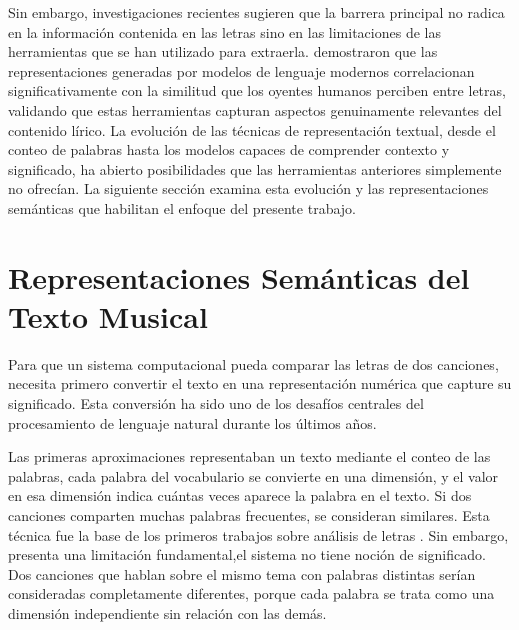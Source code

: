 Sin embargo, investigaciones recientes sugieren que la barrera principal no radica en la información contenida en las letras sino en las limitaciones de las herramientas que se han utilizado para extraerla. \textcite{akama_2024_lyric_similarity} demostraron que las representaciones generadas por modelos de lenguaje modernos correlacionan significativamente con la similitud que los oyentes humanos perciben entre letras, validando que estas herramientas capturan aspectos genuinamente relevantes del contenido lírico. La evolución de las técnicas de representación textual, desde el conteo de palabras hasta los modelos capaces de comprender contexto y significado, ha abierto posibilidades que las herramientas anteriores simplemente no ofrecían. La siguiente sección examina esta evolución y las representaciones semánticas que habilitan el enfoque del presente trabajo.

\section{Representaciones Semánticas del Texto Musical}
\label{sec:representaciones-semanticas}

Para que un sistema computacional pueda comparar las letras de dos canciones, necesita primero convertir el texto en una representación numérica que capture su significado. Esta conversión ha sido uno de los desafíos centrales del procesamiento de lenguaje natural durante los últimos años.

Las primeras aproximaciones representaban un texto mediante el conteo de las palabras, cada palabra del vocabulario se convierte en una dimensión, y el valor en esa dimensión indica cuántas veces aparece la palabra en el texto. Si dos canciones comparten muchas palabras frecuentes, se consideran similares. Esta técnica fue la base de los primeros trabajos sobre análisis de letras \parencite{patra_2013_lyrics_retrieval}. Sin embargo, presenta una limitación fundamental,el sistema no tiene noción de significado. Dos canciones que hablan sobre el mismo tema con palabras distintas serían consideradas completamente diferentes, porque cada palabra se trata como una dimensión independiente sin relación con las demás.

